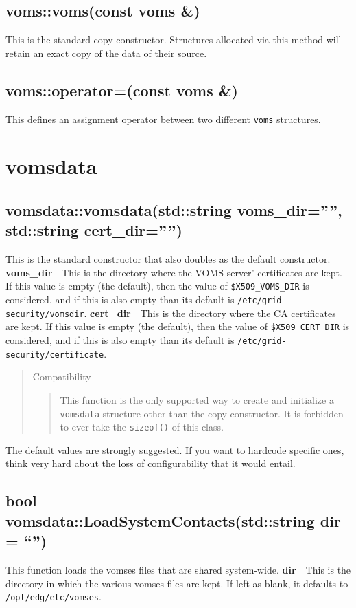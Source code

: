 \documentclass[a4paper]{book}
\newenvironment{compatibility}{\begin{quote}\color{red}Compatibility\begin{quote}}{\end{quote}\color{black}\end{quote}}
\newcommand{\parameter}[2]{\newline\textbf{#1}\ \ #2}
\begin{document}
\subsection{voms::voms(const voms \&)}
This is the standard copy constructor.  Structures allocated via this
method will retain an exact copy of the data of their source.

\subsection{voms::operator=(const voms \&)}
This defines an assignment operator between two different
\texttt{voms} structures.

\section{vomsdata}
\subsection{vomsdata::vomsdata(std::string voms\_dir='''',
    std::string cert\_dir='''')}

This is the standard constructor that also doubles as the default
constructor. 
\parameter{voms\_dir}{This is the directory where the VOMS server'
certificates are kept. If this value is empty (the default), then the
value of \texttt{\$X509\_VOMS\_DIR} is considered, and if this is also
empty than its default is \texttt{/etc/grid-security/vomsdir}.}
\parameter{cert\_dir}{This is the directory where the CA certificates
are kept. If this value is empty (the default), then the value of
\texttt{\$X509\_CERT\_DIR} is considered, and if this is also empty
than its default is \texttt{/etc/grid-security/certificate}.}

\begin{compatibility}
This function is the only supported way to create and initialize a
\texttt{vomsdata} structure other than the copy constructor. It is
forbidden to ever take the \texttt{sizeof()} of this class.
\end{compatibility}

The default values are strongly suggested.  If you want to hardcode
specific ones, think very hard about the loss of configurability that
it would entail.

\subsection{bool vomsdata::LoadSystemContacts(std::string dir = ``'')}
This function loads the vomses files that are shared system-wide.
\parameter{dir}{This is the directory in which the various vomses files are
kept.  If left as blank, it defaults to \texttt{/opt/edg/etc/vomses}.}
\end{document}
